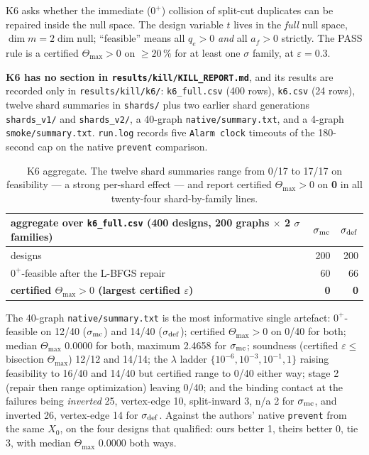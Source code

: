 \documentclass[10pt,a4paper]{article}
\newcommand{\fn}[1]{\nolinkurl{#1}}
\begin{document}
K6 asks whether the immediate ($0^+$) collision of split-cut duplicates can be repaired inside
the null space. The design variable $t$ lives in the \emph{full} null space,
$\dim m = 2\dim\mathrm{null}$; ``feasible'' means all $q_e > 0$ \emph{and} all $a_f > 0$
strictly. The PASS rule is a certified $\Theta_{\max}>0$ on $\ge20\,\%$ for at least one $\sigma$
family, at $\varepsilon = 0.3$.

\textbf{K6 has no section in \fn{results/kill/KILL_REPORT.md}}, and its results are recorded only
in \fn{results/kill/k6/}: \fn{k6_full.csv} (400 rows), \fn{k6.csv} (24 rows), twelve shard
summaries in \fn{shards/} plus two earlier shard generations \fn{shards_v1/} and
\fn{shards_v2/}, a 40-graph \fn{native/summary.txt}, and a 4-graph \fn{smoke/summary.txt}.
\fn{run.log} records five \texttt{Alarm clock} timeouts of the 180-second cap on the native
\texttt{prevent} comparison.

\begin{table}[h]\centering\small
\begin{tabular}{@{}lrr@{}}
\toprule
aggregate over \fn{k6_full.csv} (400 designs, 200 graphs $\times$ 2 $\sigma$ families) & $\sigma_{\rm mc}$ & $\sigma_{\rm def}$ \\
\midrule
designs & 200 & 200 \\
$0^+$-feasible after the L-BFGS repair & 60 & 66 \\
\textbf{certified $\Theta_{\max}>0$ (largest certified $\varepsilon$)} & \textbf{0} & \textbf{0} \\
\bottomrule
\end{tabular}
\caption{K6 aggregate. The twelve shard summaries range from 0/17 to 17/17 on feasibility --- a
strong per-shard effect --- and report certified $\Theta_{\max}>0$ on \textbf{0} in all
twenty-four shard-by-family lines.}
\end{table}

The 40-graph \fn{native/summary.txt} is the most informative single artefact:
$0^+$-feasible on 12/40 ($\sigma_{\rm mc}$) and 14/40 ($\sigma_{\rm def}$); certified
$\Theta_{\max}>0$ on 0/40 for both; median $\Theta_{\max}$ 0.0000 for both, maximum 2.4658 for
$\sigma_{\rm mc}$; soundness (certified $\varepsilon \le$ bisection $\Theta_{\max}$) 12/12 and
14/14; the $\lambda$ ladder $\{10^{-6},10^{-3},10^{-1},1\}$ raising feasibility to 16/40 and
14/40 but certified range to 0/40 either way; stage 2 (repair then range optimization) leaving
0/40; and the binding contact at the failures being \emph{inverted} 25, vertex-edge 10,
split-inward 3, n/a 2 for $\sigma_{\rm mc}$, and inverted 26, vertex-edge 14 for
$\sigma_{\rm def}$. Against the authors' native \texttt{prevent} from the same $X_0$, on the four
designs that qualified: ours better 1, theirs better 0, tie 3, with median $\Theta_{\max}$
0.0000 both ways.
\end{document}
